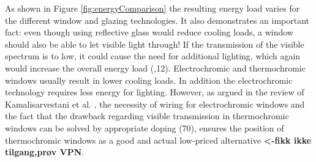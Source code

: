 %
As shown in Figure \ref{fig:energyComparison} the resulting energy load varies for the different
window and glazing technologies. 
It also demonstrates an important fact: even though using reflective glass would reduce
cooling loads, a window should also be able to let visible light through! If the transmission of
the visible spectrum is to low, it could cause the need for additional lighting, which again
would increase the overall energy load (\cite{Kamalisarvestani2013},12).
Electrochromic and thermochromic windows usually
result in lower cooling loads. In addition the electrochromic technology requires 
less energy for lighting. However, as argued in the review of Kamalisarvestani et al.
\cite{Kamalisarvestani2013}, the necessity of wiring for electrochromic windows and
the fact that the drawback regarding visible transmission in thermochromic windows can be
solved by appropriate doping \cite[p.~39]{Kanu2010}(70), ensures the position of 
thermochromic windows as a good and actual low-priced alternative \cite{Mlyuka2009}
\textbf{<-fikk ikke tilgang,prøv VPN}.







